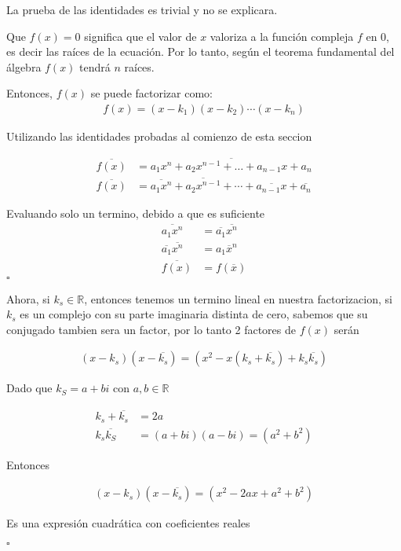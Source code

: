 \documentclass[spanish,12pt]{article}
\begin{document}
La prueba de las identidades es trivial y no se explicara.

Que $f(x)=0$ significa que el valor de $x$ valoriza a la función compleja $f$ en $0$, es decir las raíces de la ecuación. Por lo tanto, según el teorema fundamental del álgebra $f(x)$ tendrá $n$ raíces.

Entonces, $f(x)$ se puede factorizar como:
\begin{align*}
    f(x)=(x-k_1)(x-k_2)\cdots(x-k_n)
\end{align*}

Utilizando las identidades probadas al comienzo de esta seccion

\begin{align*}
    \overline{f(x)}&=\overline{a_1x^n+a_2x^{n-1}+\dots+a_{n-1}x+a_n}\\
    \overline{f(x)}&= \overline{a_1x^n}+\overline{a_2x^{n-1}}+\cdots+\overline{a_{n-1}x}+\overline{a_n}
\end{align*}

Evaluando solo un termino, debido a que es suficiente
\begin{align*}
    \overline{a_1x^n}&=\overline{a_1}\overline{x^n}\\
    \overline{a_1}\overline{x^n}&=a_1\overline{x}^n\\
    \overline{f(x)}&=f(\overline{x})
\end{align*}
\hfill $\square$

Ahora, si $k_s \in \mathbb{R}$, entonces tenemos un termino lineal en nuestra factorizacion, si $k_s$ es un complejo con su parte imaginaria distinta de cero, sabemos que su conjugado tambien sera un factor, por lo tanto 2 factores de $f(x)$ serán 

\begin{align*}
    (x-k_s)(x-\overline{k_s})=(x^2-x(k_s+\overline{k_s})+k_s\overline{k_s})
\end{align*}

Dado que $k_S=a+bi$ con $a,b \in \mathbb{R}$

\begin{align*}
    k_s+\overline{k_s}&=2a\\
    k_s\overline{k_S}&=(a+bi)(a-bi)=(a^2+b^2)
\end{align*}

Entonces

\begin{align*}
     (x-k_s)(x-\overline{k_s})= (x^2-2ax+a^2+b^2)
\end{align*}

Es una expresión cuadrática con coeficientes reales

\hfill $\square$
\end{document}
